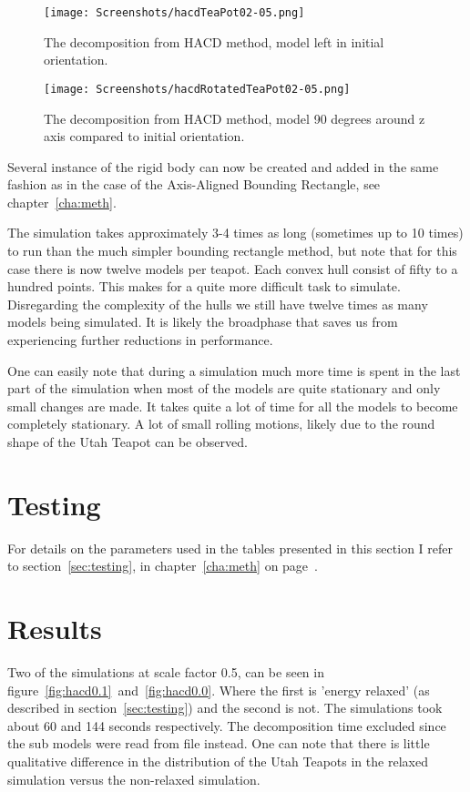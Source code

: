  \begin{figure}[H]
   \centering
   \texttt{[image: Screenshots/hacdTeaPot02-05.png]}
   \caption{The decomposition from HACD method, model left in initial orientation.}
   \label{fig:HACD}
 \end{figure}

 \begin{figure}[H]
   \centering
   \texttt{[image: Screenshots/hacdRotatedTeaPot02-05.png]}
   \caption{The decomposition from HACD method, model 90 degrees around z axis compared to initial orientation.}
   \label{fig:HACDrot}
 \end{figure}

Several instance of the rigid body can now be created and added in the same fashion
as in the case of the Axis-Aligned Bounding Rectangle, see chapter~\ref{cha:meth}.

The simulation takes approximately 3-4 times as long (sometimes up to 10 times)
 to run than the much simpler bounding rectangle method, but note that for this
 case there is now twelve models per teapot. Each convex hull consist of fifty
 to a hundred points. This makes for a quite more difficult task
to simulate. Disregarding the complexity of the hulls we still have twelve times
as many models being simulated. It is likely the broadphase that saves us from
experiencing further reductions in performance.

One can easily note that during a simulation much more time is spent in the last
part of the simulation when most of the models are quite stationary and only small
changes are made. It takes quite a lot of time for all the models to become
completely stationary. A lot of small rolling motions, likely due to the round
shape of the Utah Teapot can be observed.

\section{Testing}
For details on the parameters used in the tables presented in this section I
 refer to section~\ref{sec:testing}, in chapter~\ref{cha:meth} on
 page~\pageref{sec:testing}.

\section{Results}
Two of the simulations at scale factor 0.5, can be seen in figure~\ref{fig:hacd0.1}~and~\ref{fig:hacd0.0}. Where the first
is 'energy relaxed' (as described in section~\ref{sec:testing}) and the second is not.
The simulations took about 60 and 144 seconds respectively. The decomposition
time excluded since the sub models were read from file instead. One can note
that there is little qualitative difference in the distribution of the Utah Teapots
in the relaxed simulation versus the non-relaxed simulation.

